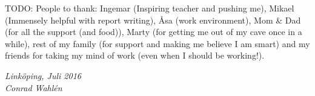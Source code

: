 \begin{acknowledgments}
  TODO: People to thank: Ingemar (Inspiring teacher and pushing me), Mikael (Immensely helpful with report writing), Åsa (work environment), Mom & Dad (for all the support (and food)), Marty (for getting me out of my cave once in a while), rest of my family (for support and making me believe I am smart) and my friends for taking my mind of work (even when I should be working!). 

  \addvspace{1em}
  \begin{flushright}
    \textit{%
      Linköping, Juli 2016\\
      Conrad Wahlén
    }
  \end{flushright}
\end{acknowledgments}
